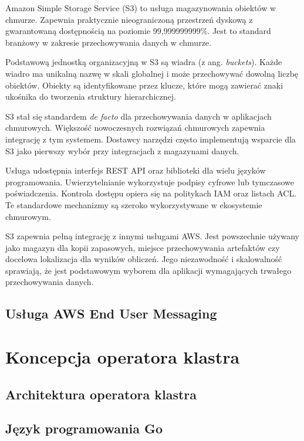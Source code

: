 Amazon Simple Storage Service (S3) to usługa magazynowania obiektów w chmurze.
Zapewnia praktycznie nieograniczoną przestrzeń dyskową z gwarantowaną dostępnością na poziomie 99,999999999\%.
Jest to standard branżowy w zakresie przechowywania danych w chmurze.

Podstawową jednostką organizacyjną w S3 są wiadra (z ang. \textit{buckets}). Każde wiadro ma unikalną nazwę w skali globalnej i może przechowywać dowolną liczbę obiektów.
Obiekty są identyfikowane przez klucze, które mogą zawierać znaki ukośnika do tworzenia struktury hierarchicznej.

S3 stał się standardem \textit{de facto} dla przechowywania danych w aplikacjach chmurowych.
Większość nowoczesnych rozwiązań chmurowych zapewnia integrację z tym systemem.
Dostawcy narzędzi często implementują wsparcie dla S3 jako pierwszy wybór przy integracjach z magazynami danych.

Usługa udostępnia interfejs REST API oraz biblioteki dla wielu języków programowania.
Uwierzytelnianie wykorzystuje podpisy cyfrowe lub tymczasowe poświadczenia.
Kontrola dostępu opiera się na politykach IAM oraz listach ACL. Te standardowe mechanizmy są szeroko wykorzystywane w ekosystemie chmurowym.

S3 zapewnia pełną integrację z innymi usługami AWS. Jest powszechnie używany jako magazyn dla kopii zapasowych, miejsce przechowywania artefaktów czy docelowa lokalizacja dla wyników obliczeń.
Jego niezawodność i skalowalność sprawiają, że jest podstawowym wyborem dla aplikacji wymagających trwałego przechowywania danych.

\subsection{Usługa AWS End User Messaging}


\section{Koncepcja operatora klastra}

\subsection{Architektura operatora klastra}

\subsection{Język programowania Go}